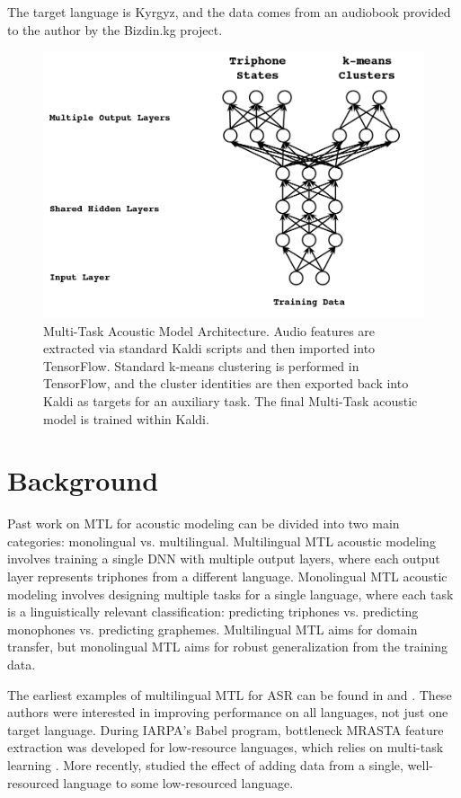 \documentclass[a4paper]{article}
\begin{document}
The target language is Kyrgyz, and the data comes from an audiobook provided to the author by the Bizdin.kg project.

\begin{figure}[!htbp]
  \centering
{}
  \includegraphics[width=\linewidth]{figs/heigold-2013-dnn-c.png}
  \caption{Multi-Task Acoustic Model Architecture. Audio features are extracted via standard Kaldi scripts and then imported into TensorFlow. Standard k-means clustering is performed in TensorFlow, and the cluster identities are then exported back into Kaldi as targets for an auxiliary task. The final Multi-Task acoustic model is trained within Kaldi.}
    \label{fig:mtl-dnn}
  \endminipage\hfill
\end{figure}


\section{Background}

Past work on MTL for acoustic modeling can be divided into two main categories: monolingual vs. multilingual. Multilingual MTL acoustic modeling involves training a single DNN with multiple output layers, where each output layer represents triphones from a different language. Monolingual MTL acoustic modeling involves designing multiple tasks for a single language, where each task is a linguistically relevant classification: predicting triphones vs. predicting monophones vs. predicting graphemes. Multilingual MTL aims for domain transfer, but monolingual MTL aims for robust generalization from the training data.

The earliest examples of multilingual MTL for ASR can be found in \cite{huang2013} and \cite{heigold2013}. These authors were interested in improving performance on all languages, not just one target language. During IARPA's Babel program, bottleneck MRASTA feature extraction was developed for low-resource languages, which relies on multi-task learning \cite{tuske2014multilingual}. More recently, \cite{grezl2016} studied the effect of adding data from a single, well-resourced language to some low-resourced language.
\end{document}
